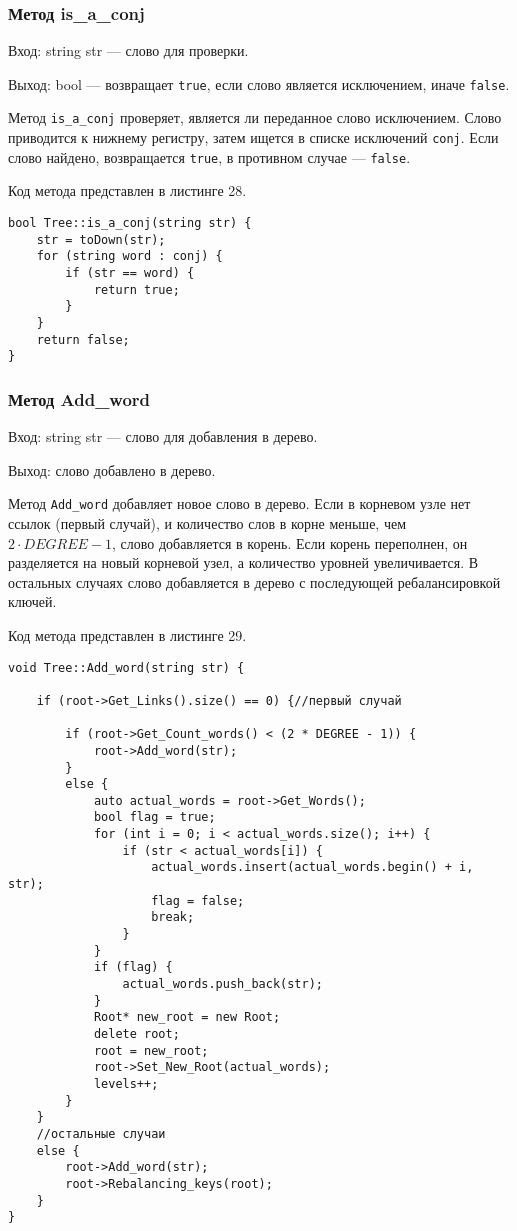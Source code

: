 \documentclass[10pt,a4paper,final]{article} %
\begin{document}
\subsubsection{Метод is\_a\_conj} Вход: string str — слово для проверки. \par

Выход: bool — возвращает \texttt{true}, если слово является исключением, иначе \texttt{false}. \par

\par Метод \texttt{is\_a\_conj} проверяет, является ли переданное слово исключением. Слово приводится к нижнему регистру, затем ищется в списке исключений \texttt{conj}. Если слово найдено, возвращается \texttt{true}, в противном случае — \texttt{false}.

Код метода представлен в листинге 28. \begin{lstlisting}[label=isAConjMethod, caption = Метод is\_a\_conj для класса Tree] 
bool Tree::is_a_conj(string str) {
	str = toDown(str);
	for (string word : conj) {
		if (str == word) {
			return true;
		}
	}
	return false;
}\end{lstlisting}


\subsubsection{Метод Add\_word} 
Вход: string str — слово для добавления в дерево. \par
Выход: слово добавлено в дерево. \par
\par Метод \texttt{Add\_word} добавляет новое слово в дерево. Если в корневом узле нет ссылок (первый случай), и количество слов в корне меньше, чем 
$2 \cdot DEGREE - 1$, слово добавляется в корень. Если корень переполнен, он разделяется на новый корневой узел, а количество уровней увеличивается. В остальных случаях слово добавляется в дерево с последующей ребалансировкой ключей.

Код метода представлен в листинге 29. \begin{lstlisting}[label=addWordTreeMethod, caption = Метод Add\_word для класса Tree] 
void Tree::Add_word(string str) {
	
	if (root->Get_Links().size() == 0) {//первый случай
		
		if (root->Get_Count_words() < (2 * DEGREE - 1)) {
			root->Add_word(str);
		}
		else {
			auto actual_words = root->Get_Words();
			bool flag = true;
			for (int i = 0; i < actual_words.size(); i++) {
				if (str < actual_words[i]) {
					actual_words.insert(actual_words.begin() + i, str);
					flag = false;
					break;
				}
			}
			if (flag) {
				actual_words.push_back(str);
			}
			Root* new_root = new Root;
			delete root;
			root = new_root;
			root->Set_New_Root(actual_words);
			levels++;
		}
	}
	//остальные случаи
	else {
		root->Add_word(str);
		root->Rebalancing_keys(root);
	}
}\end{lstlisting}
\end{document}
